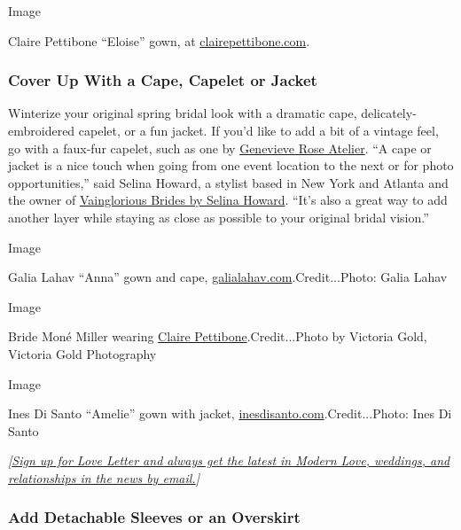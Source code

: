 Image

Claire Pettibone ``Eloise'' gown, at
\href{https://clairepettibone.com/collections/all-wedding-dresses/products/eloise-gown}{clairepettibone.com}.

\hypertarget{cover-up-with-a-cape-capelet-or-jacket}{%
\subsubsection{\texorpdfstring{\textbf{Cover Up With a Cape, Capelet or
Jacket}}{Cover Up With a Cape, Capelet or Jacket}}\label{cover-up-with-a-cape-capelet-or-jacket}}

Winterize your original spring bridal look with a dramatic cape,
delicately-embroidered capelet, or a fun jacket. If you'd like to add a
bit of a vintage feel, go with a faux-fur capelet, such as one by
\href{https://genevieveroseatelier.com/collections/cover-ups-and-wraps}{Genevieve
Rose Atelier}. ``A cape or jacket is a nice touch when going from one
event location to the next or for photo opportunities,'' said Selina
Howard, a stylist based in New York and Atlanta and the owner of
\href{http://www.vaingloriousbrides.com/}{Vainglorious Brides by Selina
Howard}. ``It's also a great way to add another layer while staying as
close as possible to your original bridal vision.''

Image

Galia Lahav ``Anna'' gown and cape,
\href{https://www.galialahav.com/bridal/couture/fancy-white/anna/}{galialahav.com}.Credit...Photo:
Galia Lahav

Image

Bride Moné Miller wearing \href{https://clairepettibone.com/}{Claire
Pettibone}.Credit...Photo by Victoria Gold, Victoria Gold Photography

Image

Ines Di Santo ``Amelie'' gown with jacket,
\href{https://www.inesdisanto.com/fall-2020-couture}{inesdisanto.com}.Credit...Photo:
Ines Di Santo

\emph{{[}}\href{https://www.nytimes3xbfgragh.onion/newsletters/love-letter?module=inline}{\emph{Sign
up for Love Letter and always get the latest in Modern Love, weddings,
and relationships in the news by email.}}\emph{{]}}

\hypertarget{add-detachable-sleeves-or-an-overskirt}{%
\subsubsection{\texorpdfstring{\textbf{Add Detachable Sleeves or an
Overskirt}}{Add Detachable Sleeves or an Overskirt}}\label{add-detachable-sleeves-or-an-overskirt}}

